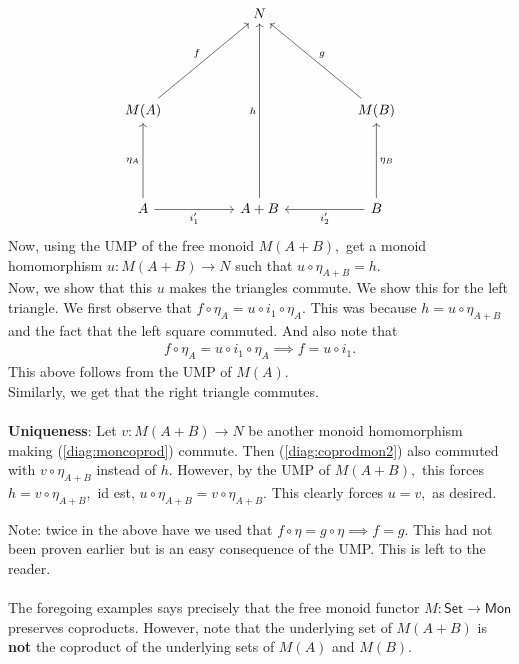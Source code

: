 \documentclass[11pt,leqno,landscape,semhelv]{seminar}
\theoremstyle{definition}
\numberwithin{joke}{section}
\numberwithin{thm}{section}
\numberwithin{equation}{section}
\begin{document}
\begin{equation} \label{diag:coprodmon2}
  \begin{tikzcd}
  && N &&\\&&&&\\&&&&\\
  M(A) \arrow[rruuu, "f"]            &  &                         &  & M(B) \arrow[lluuu, "g"']\\&&&&\\&&&&\\
  A \arrow[uuu, "\eta_A"] \arrow[rr, "i_1'"'] &  & A+B \arrow[uuuuuu, "h"] &  & B \arrow[ll, "i_2'"] \arrow[uuu, "\eta_B"']
  \end{tikzcd}
\end{equation}
Now, using the UMP of the free monoid $M(A + B),$ get a monoid homomorphism $u:M(A + B) \to N$ such that $u\circ\eta_{A+B} = h.$\\
Now, we show that this $u$ makes the triangles commute. We show this for the left triangle. We first observe that $f\circ \eta_A = u \circ i_1 \circ \eta_A.$ This was because $h = u \circ \eta_{A+B}$ and the fact that the left square commuted. And also note that
\begin{align*} 
  f\circ \eta_A = u \circ i_1 \circ \eta_A \implies f = u \circ i_1.
\end{align*}
This above follows from the UMP of $M(A).$\\
Similarly, we get that the right triangle commutes.\\~\\
%
\textbf{Uniqueness}: Let $v:M(A+B) \to N$ be another monoid homomorphism making (\ref{diag:moncoprod}) commute. Then (\ref{diag:coprodmon2}) also commuted with $v\circ \eta_{A+B}$ instead of $h.$ However, by the UMP of $M(A+B),$ this forces $h = v\circ \eta_{A+B},$ id est, $u \circ \eta_{A+B} = v \circ \eta_{A+B}.$ This clearly forces $u = v,$ as desired.
  
Note: twice in the above have we used that $f\circ \eta = g\circ\eta \implies f = g.$ This had not been proven earlier but is an easy consequence of the UMP. This is left to the reader.\\~\\
%
The foregoing examples says precisely that the free monoid functor $M:\mathsf{Set} \to \mathsf{Mon}$ preserves coproducts. However, note that the underlying set of $M(A + B)$ is \textbf{not} the coproduct of the underlying sets of $M(A)$ and $M(B).$ 
\end{document}
